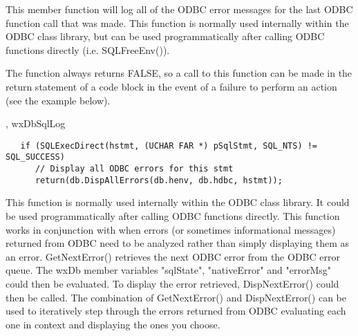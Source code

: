 




This member function will log all of the ODBC error messages for the last 
ODBC function call that was made.  This function is normally used internally 
within the ODBC class library, but can be used programmatically after calling 
ODBC functions directly (i.e. SQLFreeEnv()).


The function always returns FALSE, so a call to this function can be made 
in the return statement of a code block in the event of a failure to 
perform an action (see the example below).


, wxDbSqlLog


\begin{verbatim}
   if (SQLExecDirect(hstmt, (UCHAR FAR *) pSqlStmt, SQL_NTS) != SQL_SUCCESS)
      // Display all ODBC errors for this stmt
      return(db.DispAllErrors(db.henv, db.hdbc, hstmt));
\end{verbatim}


\label{wxdbdispnexterror}



This function is normally used internally within the ODBC class library.
It could be used programmatically after calling ODBC functions directly.  This
function works in conjunction with  when errors (or
sometimes informational messages)  returned from ODBC need to be analyzed
rather than simply displaying them as an error.  GetNextError() retrieves
the next ODBC error from the ODBC error queue.  The wxDb member variables
"sqlState", "nativeError" and "errorMsg" could then be evaluated.  To
display the error retrieved, DispNextError() could then be called.
The combination of GetNextError() and DispNextError() can be used to
iteratively step through the errors returned from ODBC evaluating each
one in context and displaying the ones you choose.

